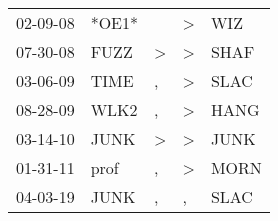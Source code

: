 \begin{supertabular}{lllll}
 02-09-08 &  *OE1* &               &  \textgreater &   WIZ \\
 07-30-08 &   FUZZ &  \textgreater &  \textgreater &  SHAF \\
 03-06-09 &   TIME &             , &  \textgreater &  SLAC \\
 08-28-09 &   WLK2 &             , &  \textgreater &  HANG \\
 03-14-10 &   JUNK &  \textgreater &  \textgreater &  JUNK \\
 01-31-11 &   prof &             , &  \textgreater &  MORN \\
 04-03-19 &   JUNK &             , &             , &  SLAC \\
\end{supertabular}
